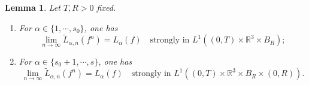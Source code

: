 \documentclass[10pt,a4paper]{amsart}
\newtheorem{lemma}{Lemma}
\def\R{\mathbb{R}}
\begin{document}
\begin{lemma}\label{converge L}
	Let $T,R>0$ fixed. 
	\begin{enumerate}
		\item {For $\alpha \in \{1,\cdots,s_0\}$, one has
			\begin{equation}
				\lim \limits_{n\rightarrow \infty} \tilde{L}_{\alpha,n} (f^n) = L_\alpha(f) \quad \text{strongly in } L^1 ((0,T)\times \R^3\times B_R);
		\end{equation}}
		\item{For $\alpha \in \{s_0+1,\cdots,s\}$, one has
			\begin{equation}
			\lim \limits_{n\rightarrow \infty} \tilde{L}_{\alpha,n} (f^n) = L_\alpha(f) \quad \text{strongly in } L^1 ((0,T)\times \R^3\times B_R\times (0,R)).
		\end{equation}}
	\end{enumerate}
\end{lemma}
\end{document}
